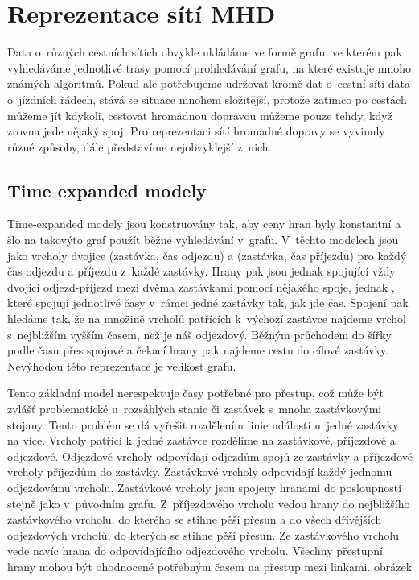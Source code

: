 \chapter{Reprezentace sítí MHD}
Data o~různých cestních sítích obvykle ukládáme ve formě grafu, ve kterém pak
vyhledáváme jednotlivé trasy pomocí prohledávání grafu, na které existuje mnoho
známých algoritmů. Pokud ale potřebujeme udržovat kromě dat o~cestní síti data
o~jízdních řádech, stává se situace mnohem složitější, protože zatímco po cestách
můžeme jít kdykoli, cestovat hromadnou dopravou můžeme pouze tehdy, když zrovna
jede nějaký spoj. Pro reprezentaci sítí hromadné dopravy se vyvinuly různé
způsoby, dále představíme nejobvyklejší z~nich.

\section{Time expanded modely}
Time-expanded modely\cite{time-expanded} jsou konstruovány tak, aby ceny hran
byly konstantní a šlo na takovýto graf použít běžné vyhledávání v~grafu.
V~těchto modelech jsou jako vrcholy dvojice (zastávka, čas odjezdu) a (zastávka,
čas příjezdu) pro každý čas odjezdu a příjezdu z~každé zastávky. Hrany pak
jsou jednak  spojující vždy dvojici odjezd-příjezd mezi dvěma
zastávkami pomocí nějakého spoje, jednak , které spojují jednotlivé
časy v~rámci jedné zastávky tak, jak jde čas. Spojení pak hledáme tak, že na
množině vrcholů patřících k~výchozí zastávce najdeme vrchol s~nejbližším vyšším
časem, než je náš odjezdový. Běžným průchodem do šířky podle času přes spojové a
čekací hrany pak najdeme cestu do cílové zastávky. Nevýhodou této reprezentace
je velikost grafu.

Tento základní model nerespektuje časy potřebné pro přestup, což může být
zvlášť problematické u~rozsáhlých stanic či zastávek s~mnoha zastávkovými
stojany. Tento problém se dá vyřešit rozdělením linie událostí u~jedné zastávky
na více. Vrcholy patřící k~jedné zastávce rozdělíme na zastávkové, příjezdové a
odjezdové. Odjezdové vrcholy odpovídají odjezdům spojů ze zastávky a příjezdové
vrcholy příjezdům do zastávky. Zastávkové vrcholy odpovídají každý jednomu
odjezdovému vrcholu. Zastávkové vrcholy jsou spojeny hranami do posloupnosti
stejně jako v~původním grafu. Z~příjezdového vrcholu vedou hrany do nejbližšího
zastávkového vrcholu, do kterého se stihne pěší přesun a do všech dřívějších
odjezdových vrcholů, do kterých se stihne pěší přesun. Ze zastávkového vrcholu
vede navíc hrana do odpovídajícího odjezdového vrcholu. Všechny přestupní hrany
mohou být ohodnocené potřebným časem na přestup mezi linkami. 
\TODO obrázek

